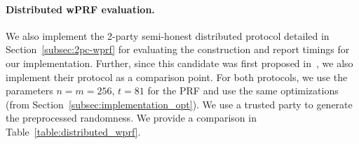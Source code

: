 \begin{table}[t]
	{
		\centering
        \iffull\else{}\fi
		\caption{Centralized 23-wPRF benchmarks for a baseline implementation and for different optimization techniques. Packing was done into 64-bit sized words (for both $\Z_2$ and $\Z_3$ vectors). For the lookup table optimization, a table with $81 \times 2^{20}$ $\Z_3$ elements, or roughly of size $135$MB, was preprocessed. Runtimes are all given in microseconds ($\mu$s).
		}
		\label{table:optimization_benchmarks}
	}
\end{table}


\paragraph{Distributed wPRF evaluation.}
\iffull
We also implement the 2-party semi-honest distributed protocol detailed in Section~\ref{subsec:2pc-wprf} for evaluating the \ttwPRF construction and report timings for our implementation. Further, since this candidate was first proposed in~\cite{boneh2018-darkmatter}, we also implement their protocol as a comparison point. For both protocols, we use the parameters $n=m=256$, $t=81$ for the PRF and use the same optimizations \iffull(from Section~\ref{subsec:implementation_opt})\fi. We use a trusted party to generate the preprocessed randomness. We provide a comparison in Table~\ref{table:distributed_wprf}.


